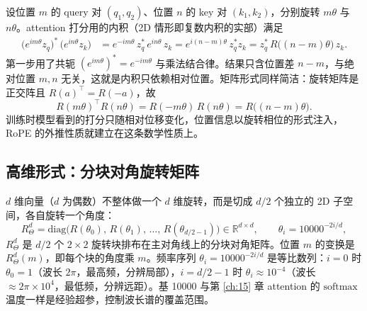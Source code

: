 设位置 $m$ 的 query 对 $(q_1,q_2)$、位置 $n$ 的 key 对 $(k_1,k_2)$，分别旋转 $m\theta$ 与 $n\theta$。attention 打分用的内积（2D 情形即复数内积的实部）满足
\begin{align}
  \big(e^{im\theta} z_q\big)^{*}\,\big(e^{in\theta} z_k\big)
  &= e^{-im\theta}\, z_q^{*}\, e^{in\theta}\, z_k
   = e^{i(n-m)\theta}\, z_q^{*} z_k
   = z_q^{*}\, R\big((n-m)\theta\big)\, z_k .
  \label{eq:ch07-relative}
\end{align}
第一步用了共轭 $ (e^{im\theta})^{*} = e^{-im\theta}$ 与乘法结合律。结果只含位置差 $n - m$，与绝对位置 $m, n$ 无关，这就是内积只依赖相对位置。矩阵形式同样简洁：旋转矩阵是正交阵且 $R(a)^{\top} = R(-a)$，故
\begin{equation}
  R(m\theta)^{\top} R(n\theta) = R(-m\theta)\,R(n\theta) = R\big((n-m)\theta\big).
\end{equation}
训练时模型看到的打分只随相对位移变化，位置信息以旋转相位的形式注入，RoPE 的外推性质就建立在这条数学性质上。

\subsection{高维形式：分块对角旋转矩阵}

$d$ 维向量（$d$ 为偶数）不整体做一个 $d$ 维旋转，而是切成 $d/2$ 个独立的 2D 子空间，各自旋转一个角度：
\begin{equation}
  R^{d}_{\Theta}
  = \mathrm{diag}\big(R(\theta_0),\, R(\theta_1),\, \dots,\, R(\theta_{d/2-1})\big)
  \in \mathbb{R}^{d \times d},
  \qquad
  \theta_i = 10000^{-2i/d},
  \label{eq:ch07-blockdiag}
\end{equation}
$R^{d}_{\Theta}$ 是 $d/2$ 个 $2\times 2$ 旋转块排布在主对角线上的分块对角矩阵。位置 $m$ 的变换是 $R^{d}_{\Theta}(m)$，即每个块的角度乘 $m$。频率序列 $\theta_i = 10000^{-2i/d}$ 是等比数列：$i = 0$ 时 $\theta_0 = 1$（波长 $2\pi$，最高频，分辨局部），$i = d/2 - 1$ 时 $\theta_i \approx 10^{-4}$（波长 $\approx 2\pi \times 10^4$，最低频，分辨远距）。基 10000 与第 \ref{ch:15} 章 attention 的 $\mathrm{softmax}$ 温度一样是经验超参，控制波长谱的覆盖范围。

